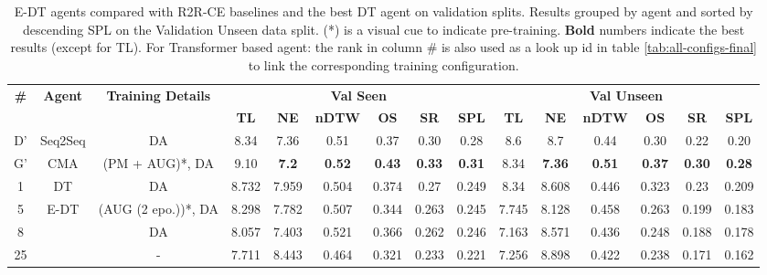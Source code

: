 \begin{table}
\centering
\caption{\label{tab:e_dt_final}E-DT agents compared with R2R-CE baselines and the best DT agent on validation splits. Results grouped by agent and sorted by descending SPL on the Validation Unseen data split. (*) is a visual
cue to indicate pre-training.  \textbf{Bold} numbers indicate the best results (except for TL). For Transformer based agent: the rank in column \# is also used as a look up id in table \ref{tab:all-configs-final} to link the corresponding training configuration.}
\begin{tabular}{@{\hskip3pt}c@{\hskip3pt}c@{\hskip3pt}c@{\hskip3pt}c@{\hskip3pt}c@{\hskip3pt}c@{\hskip3pt}c@{\hskip3pt}c@{\hskip3pt}c@{\hskip3pt}c@{\hskip3pt}c@{\hskip3pt}c@{\hskip3pt}c@{\hskip3pt}c@{\hskip3pt}c}
\toprule
\textbf{\#} & \textbf{Agent} & \textbf{Training Details} & \multicolumn{6}{c}{\textbf{Val Seen}} & \multicolumn{6}{c}{\textbf{Val Unseen}} \\
 \cmidrule(l){4-9}\cmidrule(l){10-15}\textbf{~} &     \textbf{~} &                \textbf{~} &       \textbf{TL} &     \textbf{NE} &   \textbf{nDTW} &     \textbf{OS} &    \textbf{SR} &    \textbf{SPL} &         \textbf{TL} &     \textbf{NE} &   \textbf{nDTW} &     \textbf{OS} &    \textbf{SR} &    \textbf{SPL} \\
\midrule
          D' & Seq2Seq & DA & 8.34 & 7.36 & 0.51 & 0.37 & 0.30 & 0.28 & 8.6 & 8.7 & 0.44 & 0.30 & 0.22 & 0.20 \\
          \midrule
          G' & CMA & (PM + AUG)*, DA  & 9.10 & \textbf{7.2} & \textbf{0.52} & \textbf{0.43} & \textbf{0.33} & \textbf{0.31} & 8.34 & \textbf{7.36} & \textbf{0.51} & \textbf{0.37} & \textbf{0.30} & \textbf{0.28} \\
          \midrule
          1 &             DT &                  DA &             8.732 &           7.959 &           0.504 &  0.374 &  0.27 &  0.249 &                8.34 &           8.608 &           0.446 &  0.323 &  0.23 &  0.209 \\
          \midrule
          5 &           E-DT &  (AUG (2 epo.))*, DA &             8.298 &           7.782 &           0.507 &           0.344 &          0.263 &           0.245 &               7.745 &  8.128 &  0.458 &           0.263 &          0.199 &           0.183 \\
          8 &            &                   DA &             8.057 &  7.403 &  0.521 &           0.366 &          0.262 &           0.246 &               7.163 &           8.571 &           0.436 &           0.248 &          0.188 &           0.178 \\
         25 &            &                     - &             7.711 &           8.443 &           0.464 &           0.321 &          0.233 &           0.221 &               7.256 &           8.898 &           0.422 &           0.238 &          0.171 &           0.162 \\
\bottomrule
\end{tabular}
\end{table}
